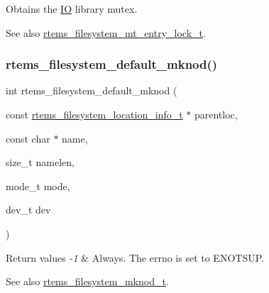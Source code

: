 Obtains the \mbox{\hyperlink{structIO}{IO}} library mutex. 

\begin{DoxySeeAlso}{See also}
\mbox{\hyperlink{group__LibIOFSOps_gae6a0c55a60927170f228b90ede1032f9}{rtems\+\_\+filesystem\+\_\+mt\+\_\+entry\+\_\+lock\+\_\+t}}. 
\end{DoxySeeAlso}
\mbox{\label{group__LibIOFSOps_ga2fe9c4e63942b2ebd92b0e1a3a089bcc}} 
\subsubsection{\texorpdfstring{rtems\_filesystem\_default\_mknod()}{rtems\_filesystem\_default\_mknod()}}
{\footnotesize\ttfamily int rtems\+\_\+filesystem\+\_\+default\+\_\+mknod (\begin{DoxyParamCaption}\item[{const \mbox{\hyperlink{group__LibIO_ga3252b3d31ee3c49ffff0b7604a676864}{rtems\+\_\+filesystem\+\_\+location\+\_\+info\+\_\+t}} $\ast$}]{parentloc,  }\item[{const char $\ast$}]{name,  }\item[{size\+\_\+t}]{namelen,  }\item[{mode\+\_\+t}]{mode,  }\item[{dev\+\_\+t}]{dev }\end{DoxyParamCaption})}


\begin{DoxyRetVals}{Return values}
{\em -\/1} & Always. The errno is set to E\+N\+O\+T\+S\+UP.\\
\hline
\end{DoxyRetVals}
\begin{DoxySeeAlso}{See also}
\mbox{\hyperlink{group__LibIOFSOps_ga9003ec0170a16478f8f47331b4fcad0a}{rtems\+\_\+filesystem\+\_\+mknod\+\_\+t}}. 
\end{DoxySeeAlso}
\mbox{\label{group__LibIOFSOps_ga6c134a7f03171ac182a6430be97b1cef}} 
